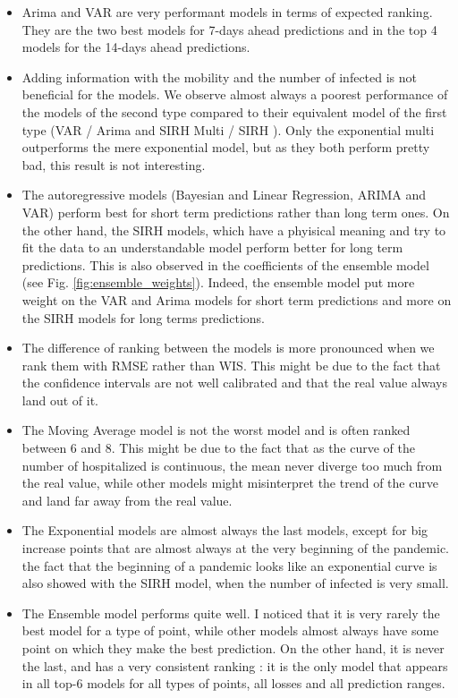 \begin{itemize}
    \item Arima and VAR are very performant models in terms of expected ranking. They are the two best models for 7-days ahead predictions and in the top 4 models for the 14-days ahead predictions. 
    \item Adding information with the mobility and the number of infected is not beneficial for the models. We observe almost always a poorest performance of the models of the second type compared to their equivalent model of the first type (VAR / Arima and SIRH Multi / SIRH ). Only the exponential multi outperforms the mere exponential model, but as they both perform pretty bad, this result is not interesting. 
    \item The autoregressive models (Bayesian and Linear Regression, ARIMA and VAR) perform best for short term predictions rather than long term ones. On the other hand, the SIRH models, which have a phyisical meaning and try to fit the data to an understandable model perform better for long term predictions. This is also observed in the coefficients of the ensemble model (see Fig. \ref{fig:ensemble_weights}). Indeed, the ensemble model put more weight on the VAR and Arima models for short term predictions and more on the SIRH models for long terms predictions.  
    \item The difference of ranking between the models is more pronounced when we rank them with RMSE rather than WIS. This might be due to the fact that the confidence intervals are not well calibrated and that the real value always land out of it. 
    \item The Moving Average model is not the worst model and is often ranked between 6 and 8. This might be due to the fact that as the curve of the number of hospitalized is continuous, the mean never diverge too much from the real value, while other models might misinterpret the trend of the curve and land far away from the real value. 
    \item The Exponential models are almost always the last models, except for big increase points that are almost always at the very beginning of the pandemic. the fact that the beginning of a pandemic looks like an exponential curve is also showed with the SIRH model, when the number of infected is very small. 
    \item The Ensemble model performs quite well. I noticed that it is very rarely the best model for a type of point, while other models almost always have some point on which they make the best prediction. On the other hand, it is never the last, and has a very consistent ranking : it is the only model that appears in all top-6 models for all types of points, all losses and all prediction ranges.
\end{itemize}




